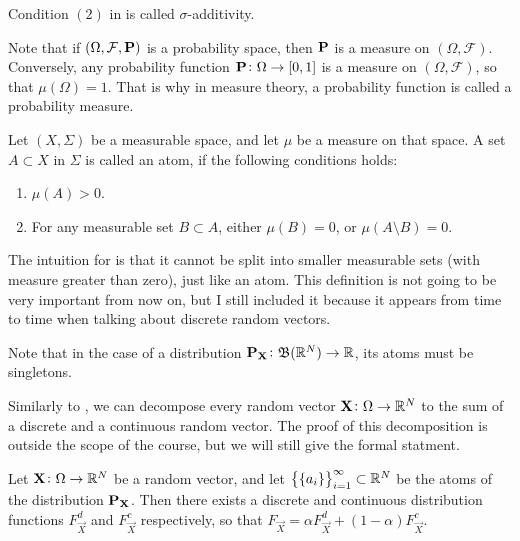 \documentclass[11pt,a4paper]{article}
\begin{document}
\begin{remark}
  Condition $(2)$ in  is called $\sigma$-additivity.
\end{remark}

\begin{remark}
  Note that if $(\Omega,\mathcal F,\mathbf{P})$ is a probability space,
  then $\mathbf{P}$ is a measure on $(\Omega,\mathcal F)$.
  Conversely, any probability function $\mathbf{P} \colon \Omega \to [0,1]$
  is a measure on $(\Omega,\mathcal F)$, so that $\mu(\Omega) = 1$.
  That is why in measure theory, a probability function is called
  a probability measure.
\end{remark}

\begin{definition}[Atom]
  \label{def:atom}
  Let $(X, \Sigma)$ be a measurable space,
  and let $\mu $ be a measure on that space.
  A set $A \subset X$ in $\Sigma$ is called an atom, if
  the following conditions holds:
  \begin{enumerate}
    \item[(1)] $\mu (A) > 0$.
    \item[(2)] For any measurable set $B \subset A$,
      either $\mu(B) = 0$, or $\mu(A \setminus B) = 0$.
  \end{enumerate}
\end{definition}

\begin{remark}
  The intuition for  is that it cannot be split into
  smaller measurable sets (with measure greater than zero),
  just like an atom.
  This definition is not going to be very important from now on,
  but I still included it because it appears from time to time
  when talking about discrete random vectors.
\end{remark}

\begin{remark}
  Note that in the case of a distribution
  $\mathbf{P}_{\boldsymbol{\mathbf{X}}} \colon \mathfrak B(\mathbb{R}^N) \to \mathbb{R}$,
  its atoms must be singletons.
\end{remark}

\begin{remark}
  Similarly to ,
  we can decompose every random vector $\boldsymbol{\mathbf{X}} \colon \Omega \to \mathbb{R}^N$
  to the sum of a discrete and a continuous random vector.
  The proof of this decomposition is outside the scope of the course,
  but we will still give the formal statment.
\end{remark}

\begin{theorem}
  Let $\boldsymbol{\mathbf{X}} \colon \Omega \to \mathbb{R}^N$ be a random vector,
  and let $\left\{\left\{a_i\right\}\right\}_{i=1}^{\infty} \subset \mathbb{R}^N$ be the atoms of
  the distribution $\mathbf{P}_{\boldsymbol{\mathbf{X}}}$.
  Then there exists a discrete and continuous distribution
  functions $F_{\vec X}^d$ and $F_{\vec X}^c$ respectively,
  so that
  $
    F_{\vec X} =
    \alpha F_{\vec X}^{d} + (1 - \alpha) F_{\vec X}^{c}
  $.
\end{theorem}
\end{document}
